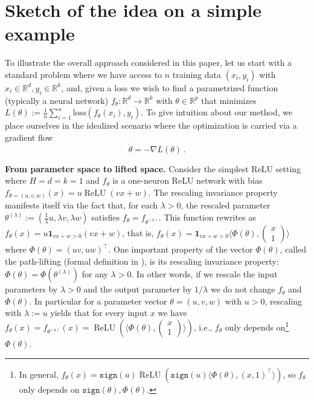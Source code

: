\documentclass{article}
\theoremstyle{plain}
\theoremstyle{definition}
\theoremstyle{remark}
\def\one{\mathbbm{1}}
\def\one{{\mathbf{1}}}
\def\relu{\operatorname{ReLU}}
\def\R{{\mathbb{R}}}
\newcommand\sign{\mathtt{sign}}
\begin{document}
\section{Sketch of the idea on a simple example \label{sec:sketch_simple_example}}
To illustrate the overall approach considered in this paper, let us start with 
a standard problem where we have access to $n$ training data $(x_i, y_i)$ with $x_i \in \R^d, y_i \in \R^k$, and, 
given a loss we wish to find a parametrized function (typically a neural network) $f_\theta: \R^d \to \R^k$ with $\theta \in \R^p$
that minimizes $L(\theta) := \frac{1}{n} \sum_{i=1}^n \text{loss}(f_\theta(x_i), y_i)$. 
To give intuition about our method, we place ourselves in the idealized scenario 
where the optimization is carried via a gradient flow 
\begin{equation}\label{eq:gradient_flow}
\dot{\theta} = -\nabla L(\theta)\,.
\end{equation}

\textbf{From parameter space to lifted space.} Consider the simplest ReLU setting where $H=d=k=1$
and $f_\theta$ is a one-neuron ReLU network with bias $f_{\theta=(u,v,w)}(x) = u\relu(vx+w)$.
The rescaling invariance property manifests itself via the fact that, for each $\lambda>0$, the rescaled parameter $\theta^{(\lambda)} := (\frac{1}{\lambda} u, \lambda v, \lambda w)$ satisfies $f_{\theta} = f_{\theta^{(\lambda)}}$.
This function rewrites as $f_{\theta}(x) = u\one_{vx + w > 0}(vx+w)$, that is, $f_{\theta}(x) = \one_{vx + w > 0}\langle 
  \Phi(\theta)
 , \begin{pmatrix}
  x \\ 1
\end{pmatrix}\rangle$ where $\Phi(\theta) = (uv, uw)^\top$.
One important property of the vector $\Phi(\theta)$, called the path-lifting (formal definition in ), is its rescaling invariance property: $\Phi(\theta) = \Phi(\theta^{(\lambda)})$  for any $\lambda > 0$.
In other words, if we rescale the input parameters by $\lambda > 0$ and the output parameter by $1/\lambda$ 
we do not change $f_{\theta}$ and $\Phi(\theta)$. In particular for a parameter vector $\theta = (u,v,w)$ with $u > 0$,  rescaling 
with $\lambda := u$ yields that for every input $x$ we have $f_\theta(x) = f_{\theta^{(u)}}(x) = \relu(\langle 
  \Phi(\theta)
 , \begin{pmatrix}
  x \\ 1
\end{pmatrix}\rangle)$,  i.e., $f_\theta$ only depends on\footnote{In general, $f_\theta(x)= \sign(u)\relu(\sign(u)\langle 
  \Phi(\theta)
 , (x, 1)^\top\rangle)$, so $f_\theta$ only depends on $\sign(\theta), \Phi(\theta)$.} $\Phi(\theta)$.
\end{document}
